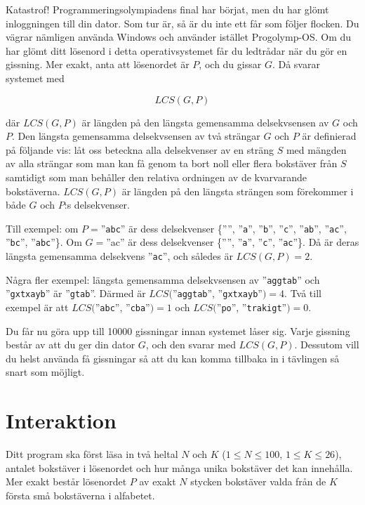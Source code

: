 Katastrof! Programmeringsolympiadens final har börjat, men du har glömt inloggningen till din dator.
Som tur är, så är du inte ett får som följer flocken. Du vägrar nämligen använda Windows och använder istället
Progolymp-OS. Om du har glömt ditt lösenord i detta operativsystemet får du ledtrådar när du gör en gissning.
Mer exakt, anta att lösenordet är $P$, och du gissar $G$. Då svarar systemet med

$$LCS(G,P)$$

där $LCS(G,P)$ är längden på den längsta gemensamma delsekvsensen av $G$ och $P$. Den längsta gemensamma
delsekvsensen av två strängar $G$ och $P$ är definierad på följande vis: låt oss beteckna alla delsekvenser av
en sträng $S$ med mängden av alla strängar som man kan få genom ta bort noll eller flera bokstäver
från $S$ samtidigt som man behåller den relativa ordningen av de kvarvarande bokstäverna. $LCS(G,P)$ är längden
på den längsta strängen som förekommer i både $G$ och $P$:s delsekvenser.

Till exempel: om $P=$''\texttt{abc}'' är dess delsekvenser \{'''', ''\texttt{a}'', ''\texttt{b}'', ''\texttt{c}'',
''\texttt{ab}'', ''\texttt{ac}'', ''\texttt{bc}'', ''\texttt{abc}''\}.
Om $G=$''ac'' är dess delsekvenser \{'''', ''\texttt{a}'', ''\texttt{c}'', ''\texttt{ac}''\}. Då är deras längsta
gemensamma delsekvens ''\texttt{ac}'', och således är $LCS(G,P)=2$.

Några fler exempel: längsta gemensamma delsekvsensen av ''\texttt{aggtab}'' och ''\texttt{gxtxayb}'' är
''\texttt{gtab}''. Därmed är $LCS($''\texttt{aggtab}'', ''\texttt{gxtxayb}''$) = 4$. Två till exempel är
att $LCS($''\texttt{abc}'', ''\texttt{cba}''$) = 1$ och $LCS($''\texttt{po}'', ''\texttt{trakigt}''$) = 0$.

Du får nu göra upp till 10000 gissningar innan systemet låser sig. Varje gissning består av att du ger din
dator $G$, och den svarar med $LCS(G,P)$. Dessutom vill du helst använda få gissningar så att du kan komma
tillbaka in i tävlingen så snart som möjligt.

\section*{Interaktion}
Ditt program ska först läsa in två heltal $N$ och $K$ ($1 \leq N \leq 100$, $1 \leq K \leq 26$), antalet bokstäver
i lösenordet och hur många unika bokstäver det kan innehålla.
Mer exakt består lösenordet $P$ av exakt $N$ stycken bokstäver valda från de $K$ första små bokstäverna i alfabetet.

